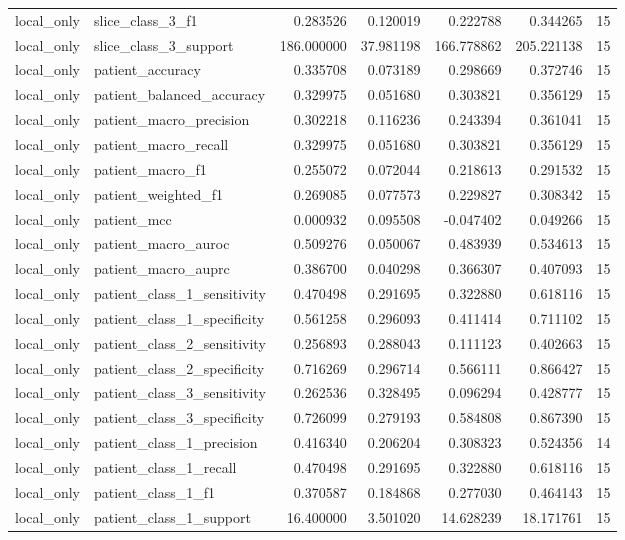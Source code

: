 \begin{tabular}{llrrrrr}
local_only & slice_class_3_f1 & 0.283526 & 0.120019 & 0.222788 & 0.344265 & 15 \\
local_only & slice_class_3_support & 186.000000 & 37.981198 & 166.778862 & 205.221138 & 15 \\
local_only & patient_accuracy & 0.335708 & 0.073189 & 0.298669 & 0.372746 & 15 \\
local_only & patient_balanced_accuracy & 0.329975 & 0.051680 & 0.303821 & 0.356129 & 15 \\
local_only & patient_macro_precision & 0.302218 & 0.116236 & 0.243394 & 0.361041 & 15 \\
local_only & patient_macro_recall & 0.329975 & 0.051680 & 0.303821 & 0.356129 & 15 \\
local_only & patient_macro_f1 & 0.255072 & 0.072044 & 0.218613 & 0.291532 & 15 \\
local_only & patient_weighted_f1 & 0.269085 & 0.077573 & 0.229827 & 0.308342 & 15 \\
local_only & patient_mcc & 0.000932 & 0.095508 & -0.047402 & 0.049266 & 15 \\
local_only & patient_macro_auroc & 0.509276 & 0.050067 & 0.483939 & 0.534613 & 15 \\
local_only & patient_macro_auprc & 0.386700 & 0.040298 & 0.366307 & 0.407093 & 15 \\
local_only & patient_class_1_sensitivity & 0.470498 & 0.291695 & 0.322880 & 0.618116 & 15 \\
local_only & patient_class_1_specificity & 0.561258 & 0.296093 & 0.411414 & 0.711102 & 15 \\
local_only & patient_class_2_sensitivity & 0.256893 & 0.288043 & 0.111123 & 0.402663 & 15 \\
local_only & patient_class_2_specificity & 0.716269 & 0.296714 & 0.566111 & 0.866427 & 15 \\
local_only & patient_class_3_sensitivity & 0.262536 & 0.328495 & 0.096294 & 0.428777 & 15 \\
local_only & patient_class_3_specificity & 0.726099 & 0.279193 & 0.584808 & 0.867390 & 15 \\
local_only & patient_class_1_precision & 0.416340 & 0.206204 & 0.308323 & 0.524356 & 14 \\
local_only & patient_class_1_recall & 0.470498 & 0.291695 & 0.322880 & 0.618116 & 15 \\
local_only & patient_class_1_f1 & 0.370587 & 0.184868 & 0.277030 & 0.464143 & 15 \\
local_only & patient_class_1_support & 16.400000 & 3.501020 & 14.628239 & 18.171761 & 15 \\

\end{tabular}
